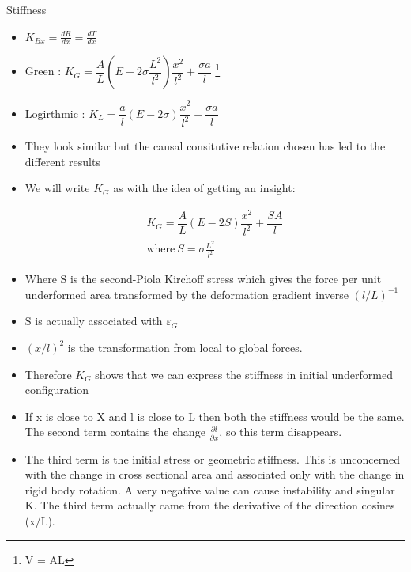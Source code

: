 	\begin{frame}{Stiffness}
		\begin{block}{}
			\begin{itemize}
				\item $K_{Bx} =  \frac{dR}{dx} = \frac{dT}{dx}$
				
				\item Green : $K_{G} =  \dfrac{A}{L}\left(E - 2\sigma \dfrac{L^2}{l^2} \right)\dfrac{x^2}{l^2} + \dfrac{\sigma a}{l}$ \footnote{V = AL}
				
				\item  Logirthmic : $K_{L} =  \dfrac{a}{l}\left(E - 2\sigma \right)\dfrac{x^2}{l^2} + \dfrac{\sigma a}{l}$		
			\end{itemize}
		\end{block}
	
		\begin{itemize}
			\item  They look similar but the causal consitutive relation chosen has led to the different results
			
			\item We will write $K_G$ as with the idea of getting an insight:
			
			\begin{align*}
				K_{G} =  \dfrac{A}{L}\left(E - 2S \right)\dfrac{x^2}{l^2} + \dfrac{S A}{l}\\
				\text{where}~S = \sigma \frac{L^2}{l^2}
			\end{align*}
			\item  Where S is the second-Piola Kirchoff stress which gives the force per unit underformed area transformed by the deformation gradient inverse $(l/L)^{-1}$
		\end{itemize}
		 
	\end{frame}

	\begin{frame}
		\begin{itemize}
			\item S is actually associated with $\varepsilon_G$
			\item $(x/l)^2$ is the transformation from local to global forces. 
			\item Therefore $K_G$ shows that we can express the stiffness in initial underformed configuration
			\item If x is close to X and l is close to L then both the stiffness would be the same. The second term contains the change $\frac{\partial l}{\partial x}$, so this term disappears. 
			\item The third term is the initial stress or geometric stiffness. This is unconcerned with the change in cross sectional area and associated only with the change in rigid body rotation. A very negative value can cause instability and singular K. The third term actually came from the derivative of the direction cosines (x/L). 
			
		\end{itemize}
	\end{frame}


